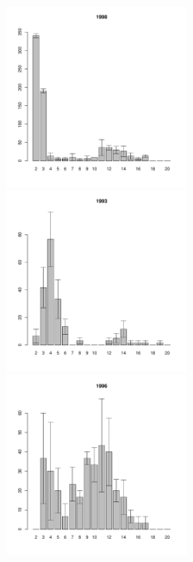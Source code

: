\begin{figure}[hp]
	\begin{minipage}[b]{.3\linewidth}
	\begin{center}
\includegraphics[width=60mm]{../White_Sea/Estuatiy_Luvenga/sizestr2_1998_.pdf}
	\end{center}
	\end{minipage}
	\begin{minipage}[b]{.3\linewidth}
	\begin{center}
	\includegraphics[width=60mm]{../White_Sea/Estuatiy_Luvenga/sizestr2_1993_.pdf}
	\end{center}
	\end{minipage}
	\hfil %
	\begin{minipage}[b]{.3\linewidth}
	\begin{center}
	\includegraphics[width=60mm]{../White_Sea/Estuatiy_Luvenga/sizestr2_1996_.pdf}

\end{center}
\end{minipage}
\end{figure}
